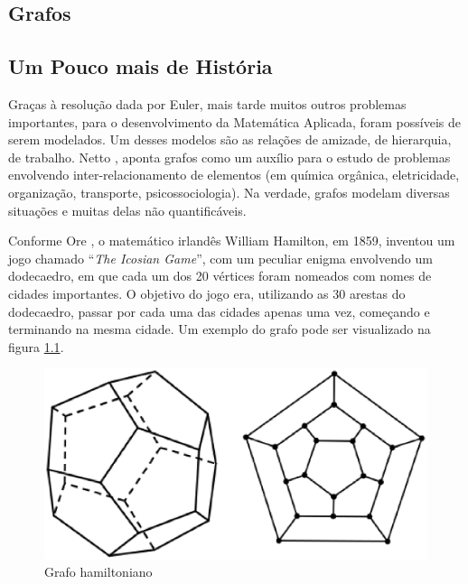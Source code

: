 \begin{apendicesenv}

\partapendices

\chapter{Grafos}

\section{Um Pouco mais de História}

Graças à resolução dada por Euler, mais tarde muitos outros problemas importantes, para o desenvolvimento da Matemática Aplicada, foram possíveis de serem modelados. Um desses modelos são as relações de amizade, de hierarquia, de trabalho. Netto \cite{Netto:2012}, aponta grafos como um auxílio para o estudo de problemas envolvendo inter-relacionamento de elementos (em química orgânica, eletricidade, organização, transporte, psicossociologia). Na verdade, grafos modelam diversas situações e muitas delas não quantificáveis.

Conforme Ore \cite{Ore:1963}, o matemático irlandês William Hamilton, em 1859, inventou um jogo chamado ``\textit{The Icosian Game}'', com um peculiar enigma envolvendo um dodecaedro, em que cada um dos 20 vértices foram nomeados com nomes de cidades importantes. O objetivo do jogo era, utilizando as 30 arestas do dodecaedro, passar por cada uma das cidades apenas uma vez, começando e terminando na mesma cidade. Um exemplo do grafo pode ser visualizado na figura \ref{grafo_hamiltoniano}.

\begin{figure}[!h]
	\centering
	\includegraphics[scale=0.3]{figuras/referencial_teorico/grafo_hamiltoniano.eps}
	\caption[Grafo hamiltoniano]{Grafo hamiltoniano \cite{Ore:1963}}
	\label{grafo_hamiltoniano}
\end{figure}


\end{apendicesenv}
